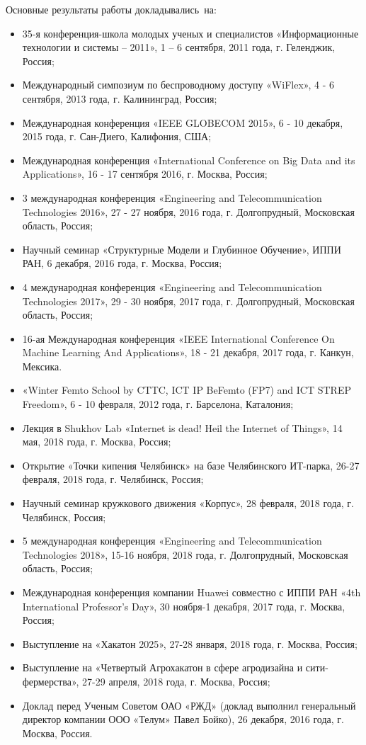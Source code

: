 {\probation}
Основные результаты работы докладывались~на:
\begin{itemize}
\item 35-я конференция-школа молодых ученых и специалистов «Информационные технологии и системы – 2011», 1 – 6 сентября, 2011 года, г. Геленджик, Россия;
\item Международный симпозиум по беспроводному доступу «WiFlex», 4 - 6 сентября,  2013 года, г. Калининград, Россия;
\item Международная конференция «IEEE GLOBECOM 2015», 6 - 10 декабря, 2015 года, г. Сан-Диего, Калифония, США;
\item Международная конференция «International Conference on Big Data and its Applications», 16 - 17 сентября 2016, г. Москва, Россия;
\item 3 международная конференция «Engineering and Telecommunication Technologies 2016», 27 - 27 ноября, 2016 года, г. Долгопрудный, Московская область, Россия;
\item Научный семинар «Структурные Модели и Глубинное Обучение», ИППИ РАН, 6 декабря, 2016 года, г. Москва, Россия;
\item 4 международная конференция «Engineering and Telecommunication Technologies 2017», 29 - 30 ноября, 2017 года, г. Долгопрудный, Московская область, Россия;
\item 16-ая Международная конференция «IEEE International Conference On Machine Learning And Applications», 18 - 21 декабря, 2017 года, г. Канкун, Мексика.
\item «Winter Femto School by CTTC, ICT IP BeFemto (FP7) and ICT STREP Freedom», 6 - 10 февраля, 2012 года, г. Барселона, Каталония;
\item Лекция в Shukhov Lab «Internet is dead! Heil the Internet of Things», 14 мая, 2018 года, г. Москва, Россия;
\item Открытие «Точки кипения Челябинск» на базе Челябинского ИТ-парка, 26-27 февраля, 2018 года, г. Челябинск, Россия;
\item Научный семинар кружкового движения «Корпус», 28 февраля, 2018 года, г. Челябинск, Россия;
\item 5 международная конференция «Engineering and Telecommunication Technologies 2018», 15-16 ноября, 2018 года, г. Долгопрудный, Московская область, Россия;
\item Международная конференция компании Huawei совместно с ИППИ РАН «4th International Professor’s Day», 30 ноября-1 декабря, 2017 года, г. Москва, Россия;
\item Выступление на «Хакатон 2025», 27-28 января, 2018 года, г. Москва, Россия;
\item Выступление на «Четвертый Агрохакатон в сфере агродизайна и сити-фермерства», 27-29 апреля, 2018 года, г. Москва, Россия;
\item Доклад перед Ученым Советом ОАО «РЖД» (доклад выполнил генеральный директор компании ООО «Телум» Павел Бойко), 26 декабря, 2016 года, г. Москва, Россия.

\end{itemize}

